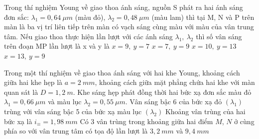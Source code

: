 \begin{ex}%
Trong thí nghiệm Young về giao thoa ánh sáng, nguồn S phát ra hai ánh sáng đơn sắc: $\lambda_1=0,64\ \mu m$ (màu đỏ), $\lambda_2=0,48\ \mu m$ (màu lam) thì tại M, N và P trên màn là ba vị trí liên tiếp trên màn có vạch sáng cùng màu với màu của vân trung tâm. Nếu giao thoa thực hiện lần lượt với các ánh sáng $\lambda_1,\ \lambda_2$ thì số vân sáng trên đoạn MP lần lượt là x và y là
\choice
{$x=9,\ y=7$}
{\True $x=7,\ y=9$}
{$x=10,\ y=13$}
{$x=13,\ y=9$}
\end{ex} 
\setcounter{ex}{0}
\PhanII
\begin{ex}
Trong một thí nghiệm về giao thoa ánh sáng với hai khe Young, khoảng cách giữa hai khe hẹp là $a=2\ mm$, khoảng cách giữa mặt phẳng chứa hai khe với màn quan sát là $D=1,2\ m$. Khe sáng hẹp phát đồng thời hai bức xạ đơn sắc màu đỏ $\lambda_1=0,66\ \mu m$ và màu lục $\lambda_2=0,55\ \mu m$.
{Vân sáng bậc 6 của bức xạ đỏ $\left(\lambda_1\right)$ trùng với vân sáng bậc 5 của bức xạ màu lục $\left(\lambda_2\right)$}
{\True Khoảng vân trùng của hai bức xạ là $i_{\equiv}=1,98\ mm$}
{\True Có $3$ vân trùng trong khoảng giữa hai điểm $M$, $N$ ở cùng phía so với vân trung tâm có tọa độ lần lượt là $3,2\ mm$ và $9,4\ mm$}
\end{ex}
